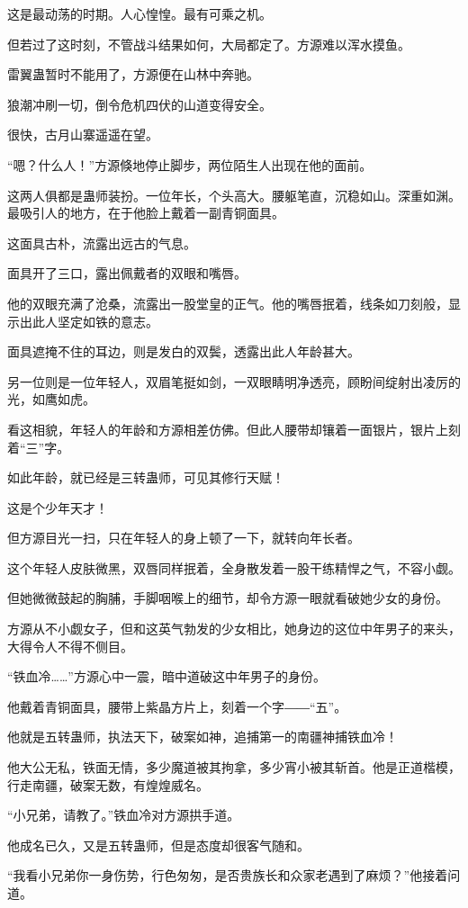 \begin{this_body}
这是最动荡的时期。人心惶惶。最有可乘之机。

但若过了这时刻，不管战斗结果如何，大局都定了。方源难以浑水摸鱼。

雷翼蛊暂时不能用了，方源便在山林中奔驰。

狼潮冲刷一切，倒令危机四伏的山道变得安全。

很快，古月山寨遥遥在望。

“嗯？什么人！”方源倏地停止脚步，两位陌生人出现在他的面前。

这两人俱都是蛊师装扮。一位年长，个头高大。腰躯笔直，沉稳如山。深重如渊。最吸引人的地方，在于他脸上戴着一副青铜面具。

这面具古朴，流露出远古的气息。

面具开了三口，露出佩戴者的双眼和嘴唇。

他的双眼充满了沧桑，流露出一股堂皇的正气。他的嘴唇抿着，线条如刀刻般，显示出此人坚定如铁的意志。

面具遮掩不住的耳边，则是发白的双鬓，透露出此人年龄甚大。

另一位则是一位年轻人，双眉笔挺如剑，一双眼睛明净透亮，顾盼间绽射出凌厉的光，如鹰如虎。

看这相貌，年轻人的年龄和方源相差仿佛。但此人腰带却镶着一面银片，银片上刻着“三”字。

如此年龄，就已经是三转蛊师，可见其修行天赋！

这是个少年天才！

但方源目光一扫，只在年轻人的身上顿了一下，就转向年长者。

这个年轻人皮肤微黑，双唇同样抿着，全身散发着一股干练精悍之气，不容小觑。

但她微微鼓起的胸脯，手脚咽喉上的细节，却令方源一眼就看破她少女的身份。

方源从不小觑女子，但和这英气勃发的少女相比，她身边的这位中年男子的来头，大得令人不得不侧目。

“铁血冷……”方源心中一震，暗中道破这中年男子的身份。

他戴着青铜面具，腰带上紫晶方片上，刻着一个字――“五”。

他就是五转蛊师，执法天下，破案如神，追捕第一的南疆神捕铁血冷！

他大公无私，铁面无情，多少魔道被其拘拿，多少宵小被其斩首。他是正道楷模，行走南疆，破案无数，有煌煌威名。

“小兄弟，请教了。”铁血冷对方源拱手道。

他成名已久，又是五转蛊师，但是态度却很客气随和。

“我看小兄弟你一身伤势，行色匆匆，是否贵族长和众家老遇到了麻烦？”他接着问道。


\end{this_body}
